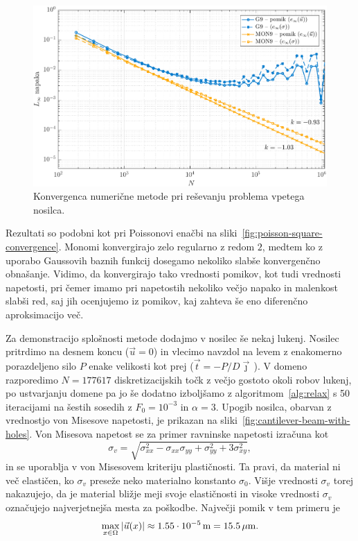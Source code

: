 \documentclass[12pt,a4paper,twoside]{article}
\theoremstyle{definition} %
\theoremstyle{plain} %
\numberwithin{equation}{section}
\newcommand{\vt}{\vec{t}}
\newcommand{\vu}{\vec{u}}
\newcommand{\vj}{\vec{\jmath}}
\newcommand{\ts}{\sigma}
\newlength{\iw}
\begin{document}
\begin{figure}[h]
  \centering
  \includegraphics[width=\iw]{images/cantilever_beam_convergence.pdf}
  \caption{Konvergenca numerične metode pri reševanju problema vpetega nosilca.}
  \label{fig:cantilever-beam-convergence}
\end{figure}
Rezultati so podobni kot pri Poissonovi enačbi na sliki~\ref{fig:poisson-square-convergence}.
Monomi konvergirajo zelo regularno z redom $2$, medtem ko z uporabo Gaussovih baznih funkcij
dosegamo nekoliko slabše konvergenčno obnašanje. Vidimo, da konvergirajo tako vrednosti pomikov, kot
tudi vrednosti napetosti, pri čemer imamo pri napetostih nekoliko večjo napako in malenkost slabši red,
saj jih ocenjujemo iz pomikov, kaj zahteva še eno diferenčno aproksimacijo več.

Za demonstracijo splošnosti metode dodajmo v nosilec še nekaj lukenj. Nosilec pritrdimo na desnem
koncu ($\vu = 0$) in vlecimo navzdol na levem z enakomerno porazdeljeno silo $P$ enake velikosti kot
prej ($\vt = -P/D\vj$\,). V domeno razporedimo $N = 177617$ diskretizacijskih točk z večjo
gostoto okoli robov lukenj, po ustvarjanju domene pa jo še dodatno izboljšamo z
algoritmom~\ref{alg:relax} s 50 iteracijami na šestih sosedih z $F_0 = 10^{-3}$ in $\alpha = 3$.
Upogib nosilca, obarvan z vrednostjo von Misesove napetosti, je prikazan na
sliki~\ref{fig:cantilever-beam-with-holes}. Von Misesova napetost se za primer ravninske napetosti
izračuna kot
\begin{equation}
  \sigma_v = \sqrt{\sigma_{xx}^2-\sigma_{xx}\sigma_{yy}+\sigma_{yy}^2+3\sigma_{xy}^2},
\end{equation}
in se uporablja v von Misesovem kriteriju plastičnosti. Ta pravi, da material ni več
elastičen, ko $\sigma_v$ preseže neko materialno konstanto $\sigma_0$. Višje vrednosti $\ts_v$
torej nakazujejo, da je material bližje meji svoje elastičnosti in visoke vrednosti $\ts_v$
označujejo najverjetnejša mesta za poškodbe. Največji pomik v tem primeru je
\begin{equation}
  \max_{x \in \Omega} |\vu(x)| \approx \unit[1.55 \cdot 10^{-5}]{m} = \unit[15.5]{\mu m}.
\end{equation}
\end{document}
